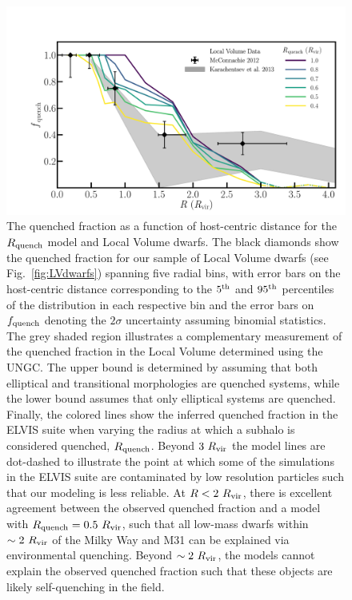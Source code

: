 \documentclass[usenatbib]{mnras}
\newcommand{\rvir}{R_{\rm vir}}
\begin{document}
\begin{figure}
 \centering
 \hspace*{-0.1in}
 \includegraphics[width=6in]{fig2.pdf}
 \caption{The quenched fraction as a function of host-centric distance for the
   $R_{\rm quench}$ model and Local Volume dwarfs. The black diamonds show the
   quenched fraction for our sample of Local Volume dwarfs (see
   Fig.~\ref{fig:LVdwarfs}) spanning five radial bins, with error bars on the
   host-centric distance corresponding to the $5^{\rm th}$ and $95^{\rm th}$
   percentiles of the distribution in each respective bin and the error bars on
   $f_{\rm quench}$ denoting the $2\sigma$ uncertainty assuming binomial
   statistics. The grey shaded region illustrates a complementary measurement of
   the quenched fraction in the Local Volume determined using the UNGC. The
   upper bound is determined by assuming that both elliptical and transitional
   morphologies are quenched systems, while the lower bound assumes that only
   elliptical systems are quenched. Finally, the colored lines show the inferred
   quenched fraction in the ELVIS suite when varying the radius at which a
   subhalo is considered quenched, $R_{\rm quench}$. Beyond $3~\rvir$
   the model lines are dot-dashed to illustrate the point at which
   some of the simulations in the ELVIS suite are contaminated by low
   resolution particles such that our modeling is less reliable.
   At $R < 2~\rvir$, there is excellent agreement between the
   observed quenched fraction and a model with 
   $R_{\rm quench}=0.5~\rvir$, such that all low-mass dwarfs within
   $\sim2~\rvir$ of the Milky Way and M31 can be explained via environmental
   quenching. Beyond $\sim2~\rvir$, the models cannot explain the
   observed quenched fraction such that these objects are likely
   self-quenching in the field. }
 \label{fig:rq}
\end{figure}
\end{document}

